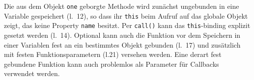Die aus dem Objekt \texttt{one} geborgte Methode wird zunächst ungebunden in eine Variable gespeichert (l.~12), so dass ihr \texttt{this} beim Aufruf auf das globale Objekt zeigt, das keine Property \texttt{name} besitzt. Per \texttt{call()} kann das \texttt{this}-binding explizit gesetzt werden (l.~14). Optional kann auch die Funktion vor dem Speichern in einer Variablen fest an ein bestimmtes Objekt gebunden (l.~17) und zusätzlich mit festen Funktionsparametern (l.21) versehen werden. Eine derart fest gebundene Funktion kann auch problemlos als Parameter für Callbacks verwendet werden.



%
%
%
%
%
%
%
%
%

